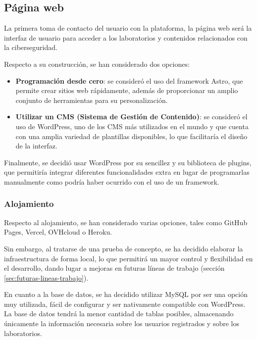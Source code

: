         \subsection{Página web}
        
            La primera toma de contacto del usuario con la plataforma, la página web será la interfaz de usuario para acceder a los laboratorios y contenidos relacionados con la ciberseguridad.
            
            Respecto a su construcción, se han considerado dos opciones:
            
            \begin{itemize}
                \item \textbf{Programación desde cero}: se consideró el uso del framework Astro, que permite crear sitios web rápidamente, además de proporcionar un amplio conjunto de herramientas para su personalización.
                \item \textbf{Utilizar un CMS (Sistema de Gestión de Contenido)}: se consideró el uso de WordPress, uno de los CMS más utilizados en el mundo y que cuenta con una amplia variedad de plantillas disponibles, lo que facilitaría el diseño de la interfaz.
            \end{itemize}

            Finalmente, se decidió usar WordPress por su sencillez y su biblioteca de plugins, que permitiría integrar diferentes funcionalidades extra en lugar de programarlas manualmente como podría haber ocurrido con el uso de un framework.
                
            \subsubsection{Alojamiento}
            
                Respecto al alojamiento, se han considerado varias opciones, tales como GitHub Pages, Vercel, OVHcloud o Heroku.
                
                Sin embargo, al tratarse de una prueba de concepto, se ha decidido elaborar la infraestructura de forma local, lo que permitirá un mayor control y flexibilidad en el desarrollo, dando lugar a mejoras en futuras líneas de trabajo (sección \ref{sec:futuras-lineas-trabajo}).

                En cuanto a la base de datos, se ha decidido utilizar MySQL por ser una opción muy utilizada, fácil de configurar y ser nativamente compatible con WordPress. La base de datos tendrá la menor cantidad de tablas posibles, almacenando únicamente la información necesaria sobre los usuarios registrados y sobre los laboratorios.
            
